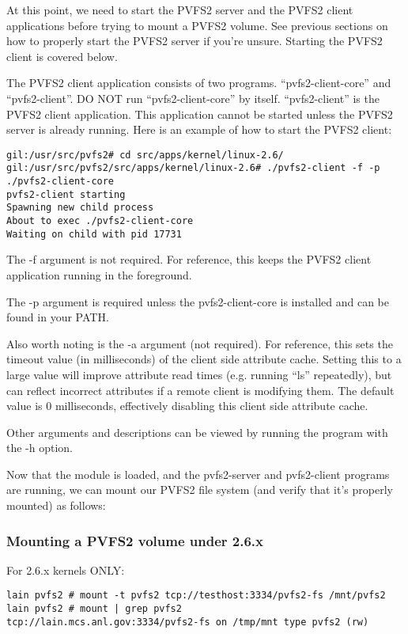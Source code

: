 \documentclass[11pt, letterpaper]{article}
\begin{document}
At this point, we need to start the PVFS2 server and the PVFS2 client
applications before trying to mount a PVFS2 volume.  See previous
sections on how to properly start the PVFS2 server if you're unsure.
Starting the PVFS2 client is covered below.

The PVFS2 client application consists of two programs.
``pvfs2-client-core'' and ``pvfs2-client''.  DO NOT run
``pvfs2-client-core'' by itself.  ``pvfs2-client'' is the PVFS2 client
application.  This application cannot be started unless the PVFS2
server is already running.  Here is an example of how to start the
PVFS2 client:

\begin{verbatim}
gil:/usr/src/pvfs2# cd src/apps/kernel/linux-2.6/
gil:/usr/src/pvfs2/src/apps/kernel/linux-2.6# ./pvfs2-client -f -p ./pvfs2-client-core
pvfs2-client starting
Spawning new child process
About to exec ./pvfs2-client-core
Waiting on child with pid 17731
\end{verbatim}

The -f argument is not required.  For reference, this keeps the PVFS2
client application running in the foreground.

The -p argument is required unless the pvfs2-client-core is installed
and can be found in your PATH.

Also worth noting is the -a argument (not required).  For reference,
this sets the timeout value (in milliseconds) of the client side
attribute cache.  Setting this to a large value will improve attribute
read times (e.g. running ``ls'' repeatedly), but can reflect incorrect
attributes if a remote client is modifying them.  The default value is
0 milliseconds, effectively disabling this client side attribute
cache.

Other arguments and descriptions can be viewed by running the program
with the -h option.

Now that the module is loaded, and the pvfs2-server and pvfs2-client
programs are running, we can mount our PVFS2 file system (and verify
that it's properly mounted) as follows:

\subsubsection{Mounting a PVFS2 volume under 2.6.x}
For 2.6.x kernels ONLY:

\begin{verbatim}
lain pvfs2 # mount -t pvfs2 tcp://testhost:3334/pvfs2-fs /mnt/pvfs2
lain pvfs2 # mount | grep pvfs2
tcp://lain.mcs.anl.gov:3334/pvfs2-fs on /tmp/mnt type pvfs2 (rw)
\end{verbatim}
\end{document}
